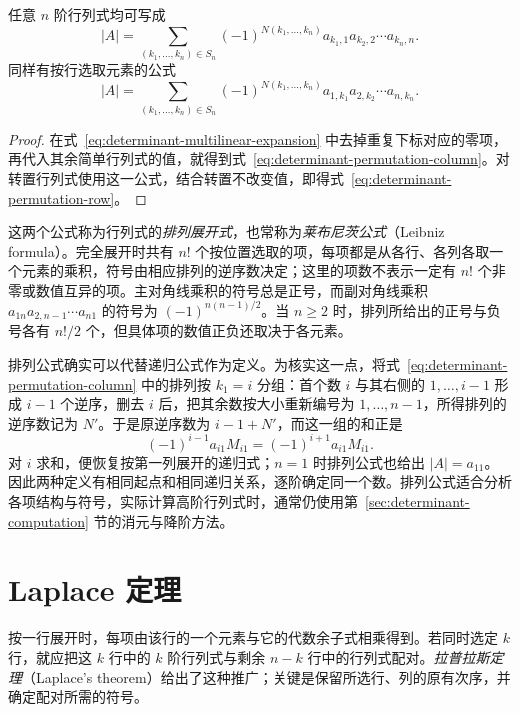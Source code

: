 \begin{theorem}[行列式的排列展开式]
\label{thm:determinant-permutation-formula}
任意 $n$ 阶行列式均可写成
\begin{equation}
\label{eq:determinant-permutation-column}
    |A|=\sum_{(k_1,\ldots,k_n)\in S_n}
       (-1)^{N(k_1,\ldots,k_n)}
       a_{k_1,1}a_{k_2,2}\cdots a_{k_n,n}.
\end{equation}
同样有按行选取元素的公式
\begin{equation}
\label{eq:determinant-permutation-row}
    |A|=\sum_{(k_1,\ldots,k_n)\in S_n}
       (-1)^{N(k_1,\ldots,k_n)}
       a_{1,k_1}a_{2,k_2}\cdots a_{n,k_n}.
\end{equation}
\end{theorem}
\begin{proof}
在式~\eqref{eq:determinant-multilinear-expansion} 中去掉重复下标对应的零项，再代入其余简单行列式的值，就得到式~\eqref{eq:determinant-permutation-column}。对转置行列式使用这一公式，结合转置不改变值，即得式~\eqref{eq:determinant-permutation-row}。
\end{proof}

这两个公式称为行列式的\emph{排列展开式}，也常称为\emph{莱布尼茨公式}（Leibniz formula）。完全展开时共有 $n!$ 个按位置选取的项，每项都是从各行、各列各取一个元素的乘积，符号由相应排列的逆序数决定；这里的项数不表示一定有 $n!$ 个非零或数值互异的项。主对角线乘积的符号总是正号，而副对角线乘积 $a_{1n}a_{2,n-1}\cdots a_{n1}$ 的符号为 $(-1)^{n(n-1)/2}$。当 $n\geq2$ 时，排列所给出的正号与负号各有 $n!/2$ 个，但具体项的数值正负还取决于各元素。

排列公式确实可以代替递归公式作为定义。为核实这一点，将式~\eqref{eq:determinant-permutation-column} 中的排列按 $k_1=i$ 分组：首个数 $i$ 与其右侧的 $1,\ldots,i-1$ 形成 $i-1$ 个逆序，删去 $i$ 后，把其余数按大小重新编号为 $1,\ldots,n-1$，所得排列的逆序数记为 $N'$。于是原逆序数为 $i-1+N'$，而这一组的和正是
\[
    (-1)^{i-1}a_{i1}M_{i1}=(-1)^{i+1}a_{i1}M_{i1}.
\]
对 $i$ 求和，便恢复按第一列展开的递归式；$n=1$ 时排列公式也给出 $|A|=a_{11}$。因此两种定义有相同起点和相同递归关系，逐阶确定同一个数。排列公式适合分析各项结构与符号，实际计算高阶行列式时，通常仍使用第~\ref{sec:determinant-computation} 节的消元与降阶方法。

\section{Laplace 定理}
\label{sec:determinant-laplace}

按一行展开时，每项由该行的一个元素与它的代数余子式相乘得到。若同时选定 $k$ 行，就应把这 $k$ 行中的 $k$ 阶行列式与剩余 $n-k$ 行中的行列式配对。\emph{拉普拉斯定理}（Laplace's theorem）给出了这种推广；关键是保留所选行、列的原有次序，并确定配对所需的符号。

